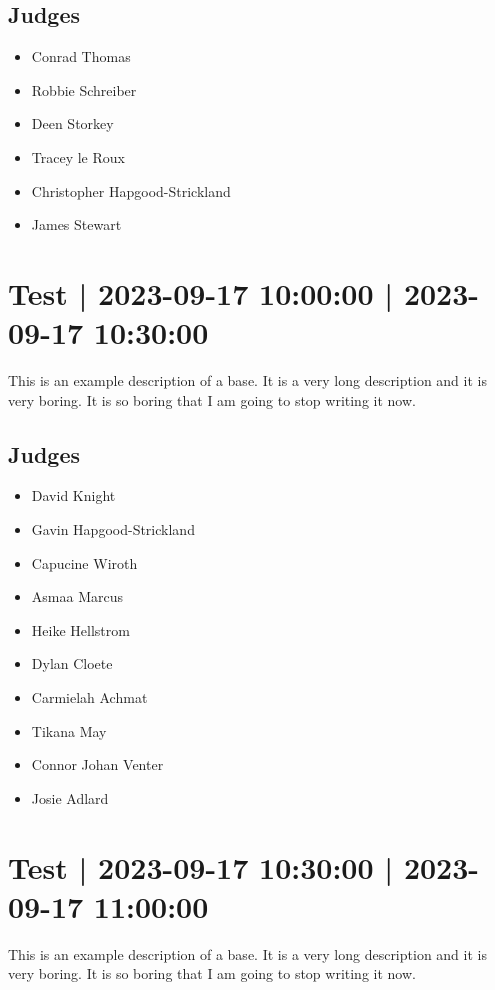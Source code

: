 \documentclass[10pt]{article}
\begin{document}
	\subsection*{Judges}
	\begin{itemize}

			\item Conrad Thomas
			\item Robbie Schreiber
			\item Deen Storkey
			\item Tracey le Roux
			\item Christopher Hapgood-Strickland
			\item James Stewart
		\end{itemize}

			\setcounter{section}{38}
	\section{Test | 2023-09-17 10:00:00 | 2023-09-17 10:30:00}
	This is an example description of a base. It is a very long description and it is very boring. It is so boring that I am going to stop writing it now.

	\subsection*{Judges}
	\begin{itemize}

			\item David Knight
			\item Gavin Hapgood-Strickland
			\item Capucine Wiroth
			\item Asmaa Marcus
			\item Heike Hellstrom
			\item Dylan Cloete
			\item Carmielah Achmat
			\item Tikana May
			\item Connor Johan Venter
			\item Josie Adlard
		\end{itemize}

			\setcounter{section}{39}
	\section{Test | 2023-09-17 10:30:00 | 2023-09-17 11:00:00}
	This is an example description of a base. It is a very long description and it is very boring. It is so boring that I am going to stop writing it now.
\end{document}
